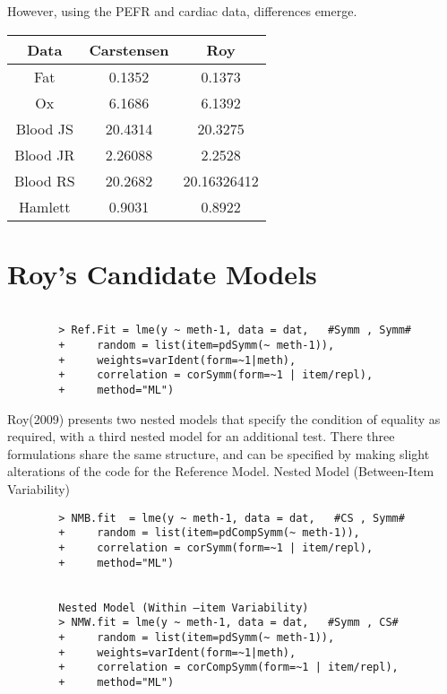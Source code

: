 \documentclass[12pt, a4paper]{report}
\theoremstyle{plain}
\theoremstyle{definition}
\theoremstyle{remark}
\begin{document}
	However, using the PEFR and cardiac data, differences emerge.
	\begin{center}
	\begin{tabular}{|c|c|c|}
		\hline
		Data & Carstensen & Roy \\
		\hline
		Fat &  0.1352 & 0.1373\\
		Ox & 6.1686 & 6.1392 \\
		Blood JS & 20.4314 & 20.3275
		\\
		Blood JR & 2.26088 & 2.2528
		\\
		Blood RS & 20.2682 & 20.16326412
		\\
		Hamlett & 0.9031 & 0.8922
		
		\\
		\hline
	\end{tabular}
	\end{center}






\section{Roy's Candidate Models}
	


\begin{framed}	
\begin{verbatim}
		
		> Ref.Fit = lme(y ~ meth-1, data = dat,   #Symm , Symm#
		+     random = list(item=pdSymm(~ meth-1)), 
		+     weights=varIdent(form=~1|meth),
		+     correlation = corSymm(form=~1 | item/repl), 
		+     method="ML")
\end{verbatim}
\end{framed}
		Roy(2009) presents two nested models that specify the condition of equality as required, with a third nested model for an additional test. There three formulations share the same structure, and can be specified by making slight alterations of the code for the Reference Model.
		Nested Model (Between-Item Variability)


\begin{framed}	\begin{verbatim}
		> NMB.fit  = lme(y ~ meth-1, data = dat,   #CS , Symm#
		+     random = list(item=pdCompSymm(~ meth-1)),
		+     correlation = corSymm(form=~1 | item/repl), 
		+     method="ML")
		
		
		Nested Model (Within –item Variability)
		> NMW.fit = lme(y ~ meth-1, data = dat,   #Symm , CS# 
		+     random = list(item=pdSymm(~ meth-1)),
		+     weights=varIdent(form=~1|meth), 
		+     correlation = corCompSymm(form=~1 | item/repl), 
		+     method="ML")
\end{verbatim}
\end{framed}
		
\end{document}
